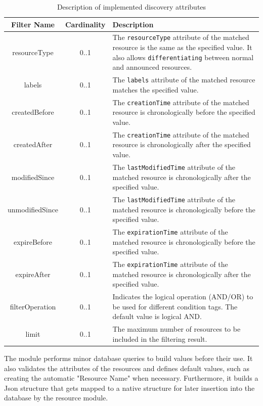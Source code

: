 \documentclass[a4paper,fleqn]{cas-dc}
\begin{document}
\begin{table}[ht]
\scriptsize
\centering
\caption{Description of implemented discovery attributes}
\label{tab:discovery_attributes}
\begin{tabular}{c c p{4cm}}
\hline
\textbf{Filter Name} & \textbf{Cardinality} & \textbf{Description} \\
\hline \hline
resourceType & 0..1 & The \texttt{resourceType} attribute of the matched resource is the same as the specified value. It also allows \texttt{differentiating} between normal and announced resources. \\
labels & 0..1 & The \texttt{labels} attribute of the matched resource matches the specified value. \\
createdBefore & 0..1 & The \texttt{creationTime} attribute of the matched resource is chronologically before the specified value. \\
createdAfter & 0..1 & The \texttt{creationTime} attribute of the matched resource is chronologically after the specified value. \\
modifiedSince & 0..1 & The \texttt{lastModifiedTime} attribute of the matched resource is chronologically after the specified value. \\
unmodifiedSince & 0..1 & The \texttt{lastModifiedTime} attribute of the matched resource is chronologically before the specified value. \\
expireBefore & 0..1 & The \texttt{expirationTime} attribute of the matched resource is chronologically before the specified value. \\
expireAfter & 0..1 & The \texttt{expirationTime} attribute of the matched resource is chronologically after the specified value. \\
filterOperation & 0..1 & Indicates the logical operation (AND/OR) to be used for different condition tags. The default value is logical AND. \\
limit & 0..1 & The maximum number of resources to be included in the filtering result. \\
\hline
\end{tabular}
\end{table}

The module performs minor database queries to build values before their use. It also validates the attributes of the resources and defines default values, such as creating the automatic "Resource Name" when necessary. Furthermore, it builds a Json structure that gets mapped to a native structure for later insertion into the database by the resource module.
\end{document}
